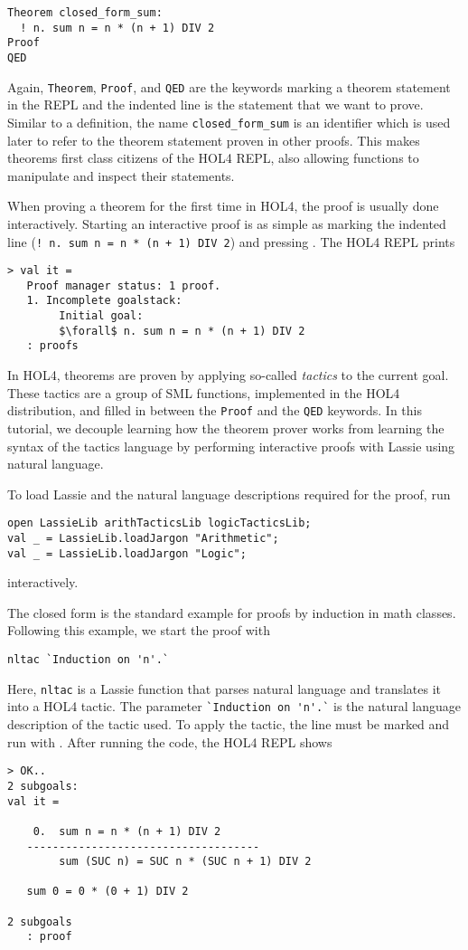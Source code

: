 \begin{lstlisting}
Theorem closed_form_sum:
  ! n. sum n = n * (n + 1) DIV 2
Proof
QED
\end{lstlisting}

Again, \lstinline{Theorem}, \lstinline{Proof}, and \lstinline{QED} are the
keywords marking a theorem statement in the REPL and the indented line is
the statement that we want to prove.
Similar to a definition, the name \lstinline{closed_form_sum} is an identifier
which is used later to refer to the theorem statement proven in other proofs.
This makes theorems first class citizens of the HOL4 REPL, also allowing
functions to manipulate and inspect their statements.

When proving a theorem for the first time in HOL4, the proof is usually done
interactively.
Starting an interactive proof is as simple as marking the indented line
(\lstinline{! n. sum n = n * (n + 1) DIV 2}) and pressing .
The HOL4 REPL prints

\begin{lstlisting}[mathescape=true, frame=single]
> val it =
   Proof manager status: 1 proof.
   1. Incomplete goalstack:
        Initial goal:
        $\forall$ n. sum n = n * (n + 1) DIV 2
   : proofs
\end{lstlisting}

In HOL4, theorems are proven by applying so-called \emph{tactics} to the current
goal.
These tactics are a group of SML functions, implemented in the HOL4
distribution, and filled in between the \lstinline{Proof} and the \lstinline{QED}
keywords.
In this tutorial, we decouple learning how the theorem prover works from
learning the syntax of the tactics language by performing interactive proofs
with Lassie using natural language.

To load Lassie and the natural language descriptions required for the proof,
run
\begin{lstlisting}
open LassieLib arithTacticsLib logicTacticsLib;
val _ = LassieLib.loadJargon "Arithmetic";
val _ = LassieLib.loadJargon "Logic";
\end{lstlisting}
interactively.

The closed form is the standard example for proofs by induction in math classes.
Following this example, we start the proof with
\begin{lstlisting}
nltac `Induction on 'n'.`
\end{lstlisting}

Here, \lstinline{nltac} is a Lassie function that parses natural language and
translates it into a HOL4 tactic.
The parameter \lstinline{`Induction on 'n'.`} is the natural language
description of the tactic used.
To apply the tactic, the line must be marked and run with .
After running the code, the HOL4 REPL shows
\begin{lstlisting}
> OK..
2 subgoals:
val it =

    0.  sum n = n * (n + 1) DIV 2
   ------------------------------------
        sum (SUC n) = SUC n * (SUC n + 1) DIV 2

   sum 0 = 0 * (0 + 1) DIV 2

2 subgoals
   : proof
\end{lstlisting}

